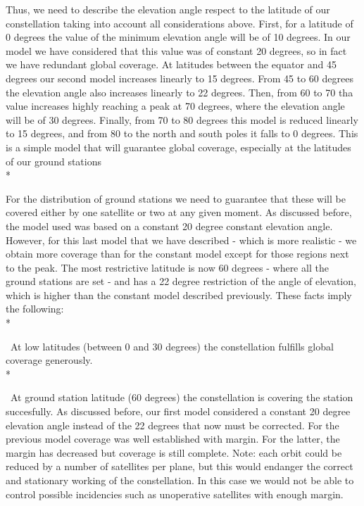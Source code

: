 Thus, we need to describe the elevation angle respect to the latitude of our constellation taking into account all considerations above. First, for a latitude of 0 degrees the value of the minimum elevation angle will be of 10 degrees. In our model we have considered that this value was of constant 20 degrees, so in fact we have redundant global coverage. At latitudes between the equator and 45 degrees our second model increases linearly to 15 degrees. From 45 to 60 degrees the elevation angle also increases linearly to 22 degrees. Then, from 60 to 70 tha value increases highly reaching a peak at 70 degrees, where the elevation angle will be of 30 degrees. Finally, from 70 to 80 degrees this model is reduced linearly to 15 degrees, and from 80 to the north and south poles it falls to 0 degrees. This is a simple model that will guarantee global coverage, especially at the latitudes of our ground stations \\*

For the distribution of ground stations we need to guarantee that these will be covered either by one satellite or two at any given moment. As discussed before, the model used was based on a constant 20 degree constant elevation angle. However, for this last model that we have described - which is more realistic - we obtain more coverage than for the constant model except for those regions next to the peak. The most restrictive latitude is now 60 degrees - where all the ground stations are set - and has a 22 degree restriction of the angle of elevation, which is higher than the constant model described previously. These facts imply the following: \\*

\textendash\  At low latitudes (between 0 and 30 degrees) the constellation fulfills global coverage generously. \\*

\textendash\ At ground station latitude (60 degrees) the constellation is covering the station succesfully. As discussed before, our first model considered a constant 20 degree elevation angle instead of the 22 degrees that now must be corrected. For the previous model coverage was well established with margin. For the latter, the margin has decreased but coverage is still complete. Note: each orbit could be reduced by a number of satellites per plane, but this would endanger the correct and stationary working of the constellation. In this case we would not be able to control possible incidencies such as unoperative satellites with enough margin. \\

